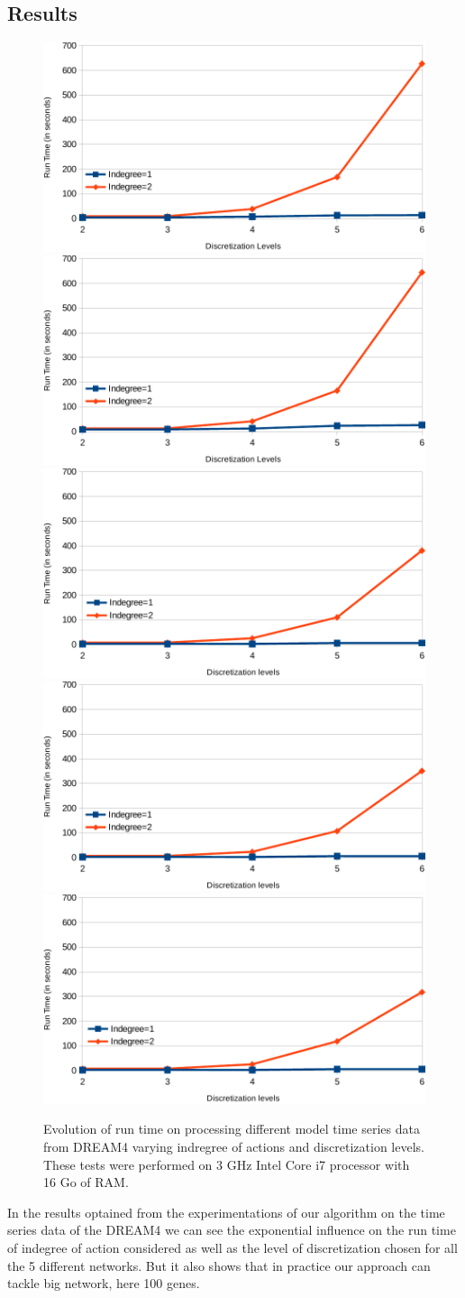\subsection{Results}

	\begin{figure} \centering
	\includegraphics[width=0.32\linewidth]{images/net1}
	\includegraphics[width=0.32\linewidth]{images/net2}
	\includegraphics[width=0.32\linewidth]{images/net3}
	\includegraphics[width=0.33\linewidth]{images/net4}
	\includegraphics[width=0.33\linewidth]{images/net5}
	\label{fig:run_time}
	\caption{Evolution of run time on processing different model time series data from DREAM4 varying indregree of actions and discretization levels. These tests were performed on 3 GHz Intel Core i7 processor with 16 Go of RAM. }
	\end{figure}

	In the results optained from the experimentations of our algorithm on the time series data of the DREAM4 we can see the exponential influence on the run time of indegree of action considered as well as the level of discretization chosen for all the 5 different networks.
	But it also shows that in practice our approach can tackle big network, here 100 genes.

